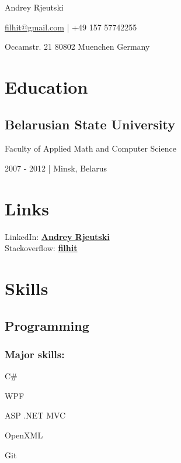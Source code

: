 \documentclass{article}
\begin{document}
  Andrey Rjeutski

  \href{mailto:filhit@gmail.com}{filhit@gmail.com} | +49 157 57742255
  
  Occamstr. 21 80802 Muenchen Germany

  \begin{minipage}[t]{0.39\textwidth}

    \section*{Education} 
    \subsection*{Belarusian State University}
    Faculty of Applied Math and Computer Science
	
    2007 - 2012 | Minsk, Belarus

    \section*{Links} 
    LinkedIn: \href{https://linkedin.com/in/andrey-rjeutski-92064741}{\bf Andrey Rjeutski} \\
    Stackoverflow: \href{http://stackoverflow.com/users/3506292/filhit}{\bf filhit}

    \section*{Skills}
    \subsection*{Programming}
    \subsubsection*{Major skills:}
	\begin{inparaitem}
      \item C\# 
	  \item WPF
	  \item ASP .NET MVC
	  \item OpenXML
	  \item Git
	\end{inparaitem}
	

\end{minipage}
\end{document}

